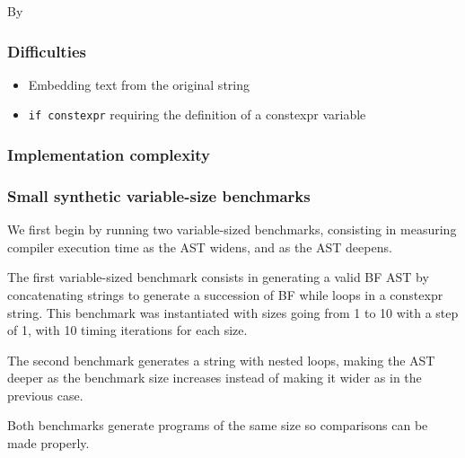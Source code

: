 \documentclass[../main]{subfiles}
\begin{document}
By

\subsubsection{
  Difficulties
}

\begin{itemize}
\item Embedding text from the original string
\item \lstinline{if constexpr} requiring the definition of a \gls{constexpr} variable
\end{itemize}

\subsubsection{
  Implementation complexity
}

\subsubsection{
  Small synthetic variable-size benchmarks
}

We first begin by running two variable-sized benchmarks, consisting in
measuring compiler execution time as the AST widens, and as the AST deepens.

The first variable-sized benchmark consists in generating a valid BF AST by
concatenating strings to generate a succession of BF while loops in a
\gls{constexpr} string. This benchmark was instantiated with sizes going from 1 to
10 with a step of 1, with 10 timing iterations for each size.

The second benchmark generates a string with
nested loops, making the AST deeper as the benchmark size increases instead
of making it wider as in the previous case.

Both benchmarks generate programs of the same size so comparisons can be made
properly.
\end{document}
